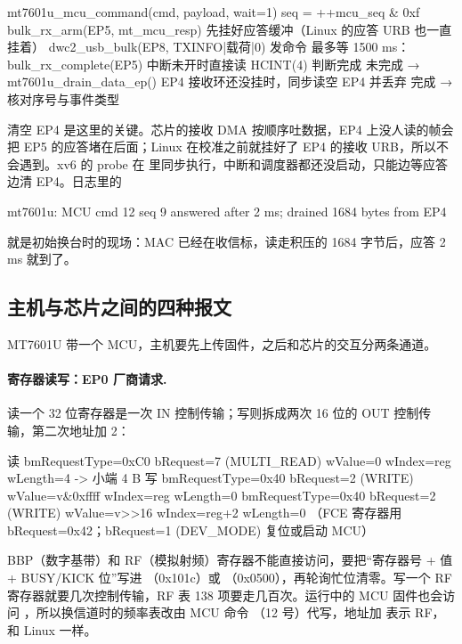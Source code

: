 \begin{txtcode}
mt7601u_mcu_command(cmd, payload, wait=1)
  seq = ++mcu_seq & 0xf
  bulk_rx_arm(EP5, mt_mcu_resp)          先挂好应答缓冲（Linux 的应答 URB 也一直挂着）
  dwc2_usb_bulk(EP8, TXINFO|载荷|0)       发命令
  最多等 1500 ms：
    bulk_rx_complete(EP5)                中断未开时直接读 HCINT(4) 判断完成
    未完成 → mt7601u_drain_data_ep()      EP4 接收环还没挂时，同步读空 EP4 并丢弃
    完成   → 核对序号与事件类型
\end{txtcode}

清空 EP4 是这里的关键。芯片的接收 DMA 按顺序吐数据，EP4 上没人读的帧会把 EP5 的应答堵在后面；Linux 在校准之前就挂好了 EP4 的接收 URB，所以不会遇到。xv6 的 probe 在  里同步执行，中断和调度器都还没启动，只能边等应答边清 EP4。日志里的
\begin{txtcode}
mt7601u: MCU cmd 12 seq 9 answered after 2 ms; drained 1684 bytes from EP4
\end{txtcode}
就是初始换台时的现场：MAC 已经在收信标，读走积压的 1684 字节后，应答 2\,ms 就到了。

\subsection{主机与芯片之间的四种报文}
\label{sec:mt7601u-wire}

MT7601U 带一个 MCU，主机要先上传固件，之后和芯片的交互分两条通道。

\paragraph{寄存器读写：EP0 厂商请求.} 读一个 32 位寄存器是一次 IN 控制传输；写则拆成两次 16 位的 OUT 控制传输，第二次地址加 2：

\begin{txtcode}
读  bmRequestType=0xC0  bRequest=7 (MULTI_READ)  wValue=0       wIndex=reg    wLength=4  -> 小端 4 B
写  bmRequestType=0x40  bRequest=2 (WRITE)       wValue=v&0xffff wIndex=reg    wLength=0
    bmRequestType=0x40  bRequest=2 (WRITE)       wValue=v>>16    wIndex=reg+2  wLength=0
    （FCE 寄存器用 bRequest=0x42；bRequest=1 (DEV_MODE) 复位或启动 MCU）
\end{txtcode}

BBP（数字基带）和 RF（模拟射频）寄存器不能直接访问，要把“寄存器号 + 值 + BUSY/KICK 位”写进 （0x101c）或 （0x0500），再轮询忙位清零。写一个 RF 寄存器就要几次控制传输，RF 表 138 项要走几百次。运行中的 MCU 固件也会访问 ，所以换信道时的频率表改由 MCU 命令 （12 号）代写，地址加  表示 RF，和 Linux 一样。


